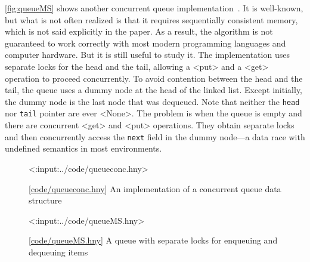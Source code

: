 \documentclass{report}
\newcommand{\harmonylink}[1]{%
[\href{https://harmony.cs.cornell.edu/#1}{\underline{#1}}]%
}
\newenvironment{code}{
\tcolorbox
}{
\endtcolorbox
}
\begin{document}
\autoref{fig:queueMS} shows another
concurrent queue implementation~\cite{MS96}.
It is well-known, but what is not often realized is that
it requires sequentially consistent memory, which is not
said explicitly in the paper.
As a result, the algorithm is not guaranteed to work
correctly with most modern programming languages and
computer hardware.  But it is still useful to study it.
The implementation uses separate
locks for the head and the tail,
allowing a <{put}> and a <{get}> operation
to proceed concurrently.  To avoid contention between the head and the tail,
the queue uses a dummy node at the head of the linked list.
Except initially, the dummy node is the last node that was dequeued.
Note that neither the \texttt{head} nor \texttt{tail} pointer are
ever <{None}>.
The problem is when the queue is empty and there are concurrent
<{get}> and <{put}> operations.
They obtain separate locks and then concurrently access the
\texttt{next} field in the dummy node---a data race with
undefined semantics in most environments.

\begin{figure}
\begin{code}
<{:input:../code/queueconc.hny}>
\end{code}
\caption{\harmonylink{code/queueconc.hny} An implementation of a concurrent queue data structure}
\label{fig:queueconc}
\end{figure}

\begin{figure}
\begin{code}
<{:input:../code/queueMS.hny}>
\end{code}
\caption{\harmonylink{code/queueMS.hny} A queue with separate locks for enqueuing and dequeuing items}
\label{fig:queueMS}
\end{figure}
\end{document}
